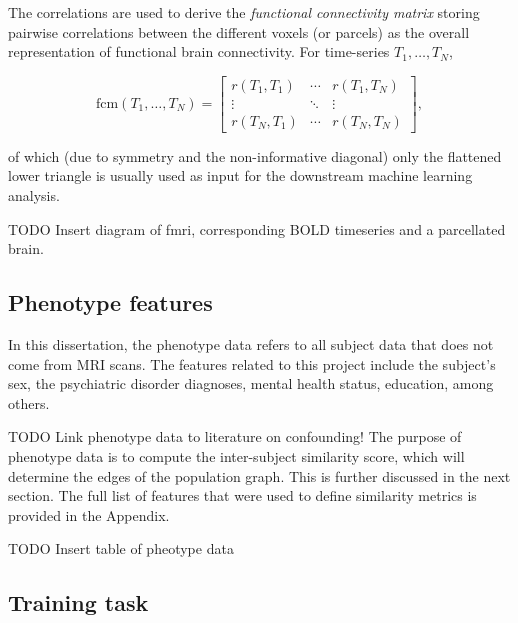 The correlations are used to derive the \textit{functional connectivity matrix} storing pairwise correlations between the different voxels (or parcels) as the overall representation of functional brain connectivity. For time-series $T_1, \dots, T_N$,

\begin{equation}
    \mathrm{fcm}(T_1, \dots, T_N) = \begin{bmatrix}
        r(T_1, T_1) & \cdots & r(T_1, T_N) \\
        \vdots & \ddots & \vdots \\
        r(T_N, T_1) & \cdots & r(T_N, T_N)
    \end{bmatrix},
\end{equation}

of which (due to symmetry and the non-informative diagonal) only the flattened lower triangle is usually used as input for the downstream machine learning analysis.

TODO Insert diagram of fmri, corresponding BOLD timeseries and a parcellated brain.



\subsection{Phenotype features}

In this dissertation, the phenotype data refers to all subject data that does not come from MRI scans. The features related to this project include the subject's sex, the psychiatric disorder diagnoses, mental health status, education, among others.

TODO Link phenotype data to literature on confounding!
The purpose of phenotype data is to compute the inter-subject similarity score, which will determine the edges of the population graph. This is further discussed in the next section. The full list of features that were used to define similarity metrics is provided in the Appendix.

TODO Insert table of pheotype data




\subsection{Training task}
\label{training-task}

